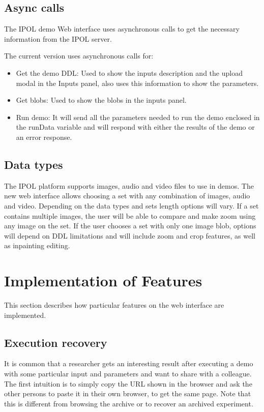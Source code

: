 
\subsection{Async calls}
The IPOL demo Web interface uses asynchronous calls to get the necessary information from the IPOL server.

The current version uses asynchronous calls for:
\begin{itemize}
\item Get the demo DDL: Used to show the inputs description and the upload modal in the Inputs panel, also uses this information to show the parameters.
\item Get blobs: Used to show the blobs in the inputs panel.
\item Run demo: It will send all the parameters needed to run the demo enclosed in the runData variable and will respond with either the results of 
the demo or an error response.
\end{itemize}


\subsection{Data types}
The IPOL platform supports images, audio and video files to use in demos. The new web interface 
allows choosing a set with any combination of images, audio and video. Depending on the data types and sets length options will vary. 
If a set contains multiple images, the user will be able to compare and make zoom using any image on the set. If the user chooses a set with only 
one image blob, options will depend on DDL limitations and will include zoom and crop features, as well as inpainting editing.

\section{Implementation of Features}
This section describes how particular features on the web interface are implemented.

%
\subsection{Execution recovery}
It is common that a researcher gets an interesting result after executing a demo with some particular input and parameters and want to share with a colleague. The first intuition is to simply copy the URL shown in the browser and ask the other persons to paste it in their own browser, to get the same page. Note that this is different from browsing the archive or to recover an archived experiment.

